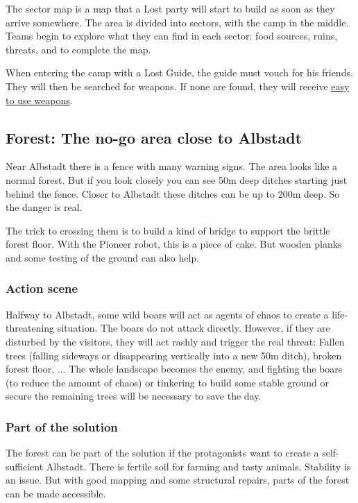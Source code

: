 The sector map is a map that a Lost party will start to build as soon as they arrive somewhere. The area is divided into sectors, with the camp in the middle. Teams begin to explore what they can find in each sector: food sources, ruins, threats, and to complete the map.

When entering the camp with a Lost Guide, the guide must vouch for his friends. They will then be searched for weapons. If none are found, they will receive  \hyperref[sec:Lost guests and weapons]{easy to use weapons}.

\subsection{Forest: The no-go area close to Albstadt}

Near Albstadt there is a fence with many warning signs. The area looks like a normal forest. But if you look closely you can see 50m deep ditches starting just behind the fence. Closer to Albstadt these ditches can be up to 200m deep. So the danger is real.

The trick to crossing them is to build a kind of bridge to support the brittle forest floor. With the Pioneer robot, this is a piece of cake. But wooden planks and some testing of the ground can also help.


\subsubsection{Action scene}

Halfway to Albstadt, some wild boars will act as agents of chaos to create a life-threatening situation. The boars do not attack directly. However, if they are disturbed by the visitors, they will act rashly and trigger the real threat: Fallen trees (falling sideways or disappearing vertically into a new 50m ditch), broken forest floor, ...
The whole landscape becomes the enemy, and fighting the boars (to reduce the amount of chaos) or tinkering to build some stable ground or secure the remaining trees will be necessary to save the day.

\subsubsection{Part of the solution}

The forest can be part of the solution if the protagonists want to create a self-sufficient Albstadt. There is fertile soil for farming and tasty animals. Stability is an issue. But with good mapping and some structural repairs, parts of the forest can be made accessible.

